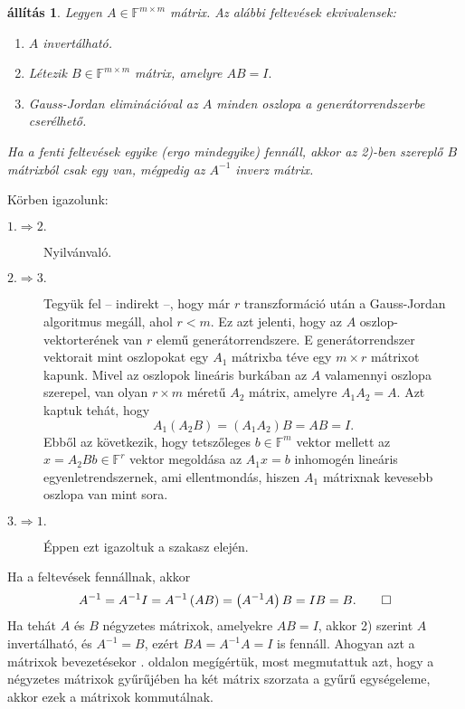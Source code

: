 \documentclass[9pt, showtrims]{memoir}
\makeatletter
\renewenvironment{proof}[1][\proofname]
    {\par\pushQED{\qed}%
    \normalfont \topsep6\p@\@plus6\p@\relax
    \trivlist
    \item[\hskip\labelsep
        \itshape
    #1\@addpunct{:}]\ignorespaces}
    {\popQED\endtrivlist\@endpefalse}
\theoremstyle{plain}
\newtheorem{proposition}{állítás}[section]
\theoremstyle{remark}
\theoremstyle{definition}
\makeatother
\begin{document}
\begin{proposition}
    Legyen $A\in\mathbb{F}^{m\times m}$ mátrix. Az alábbi feltevések ekvivalensek:
    \begin{enumerate}
        \item
            $A$ invertálható.
        \item 
            Létezik $B\in\mathbb{F}^{m\times m}$ mátrix, amelyre
            \begin{math}
                AB=I.
            \end{math}
        \item 
            Gauss-Jordan eliminációval az $A$ minden oszlopa a generátorrendszerbe cserélhető.
    \end{enumerate}
    Ha a fenti feltevések egyike (ergo mindegyike) fennáll, 
    akkor az 2)-ben szereplő $B$ mátrixból csak egy van, 
    mégpedig az $A^{-1}$ inverz mátrix.
\end{proposition}
\begin{proof}
    Körben igazolunk:
    \begin{description}
        \item[$1.\Rightarrow 2.$] Nyilvánvaló.
        \item[$2.\Rightarrow 3.$] 
            Tegyük fel -- indirekt --, hogy már $r$ transzformáció után a Gauss-Jordan algoritmus megáll, ahol $r<m$.
            Ez azt jelenti, hogy az $A$ oszlop-vektorterének van $r$ elemű generátorrendszere.
            E generátorrendszer vektorait mint oszlopokat egy $A_1$ mátrixba téve egy $m\times r$ mátrixot kapunk.
            Mivel az oszlopok lineáris burkában az $A$ valamennyi oszlopa szerepel,
            van olyan $r\times m$ méretű $A_2$ mátrix, amelyre 
            \(
            A_1A_2=A.
            \)
            Azt kaptuk tehát, hogy
            \[
                A_1\left( A_2B \right)=\left( A_1A_2 \right)B=AB=I.
            \]
            Ebből az következik,
            hogy tetszőleges $b\in\mathbb{F}^{m}$ vektor mellett az
            \begin{math}
                x=A_2Bb\in\mathbb{F}^{r}
            \end{math}
            vektor megoldása az $A_1x=b$ inhomogén lineáris egyenletrendszernek,
            ami ellentmondás, hiszen $A_1$ mátrixnak kevesebb oszlopa van mint sora.
        \item[$3.\Rightarrow 1.$] Éppen ezt igazoltuk a szakasz elején.
    \end{description}
    Ha a feltevések fennállnak, akkor
    \[
        A^{-1}=A^{-1}I=A^{-1}\left( AB \right)=\left( A^{-1}A \right)B=IB=B.\qedhere
    \]
\end{proof}
Ha tehát $A$ és $B$ négyzetes mátrixok, amelyekre $AB=I$,
akkor 2) szerint $A$ invertálható, és $A^{-1}=B$, ezért 
$BA=A^{-1}A=I$ is fennáll.
Ahogyan azt a mátrixok bevezetésekor . oldalon megígértük,
most megmutattuk azt, hogy a négyzetes mátrixok gyűrűjében ha két mátrix szorzata a gyűrű
egységeleme, akkor ezek a mátrixok kommutálnak.
\end{document}
